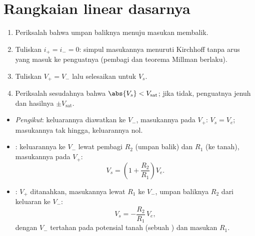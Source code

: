 \section{Rangkaian linear dasarnya}

\begin{method}\label{met:b1:operational-amplifier:method}
\begin{enumerate}
  \item Periksalah bahwa umpan baliknya menuju masukan membalik.
  \item Tuliskan $i_+ = i_- = 0$: simpul masukannya menuruti  Kirchhoff tanpa arus yang masuk ke penguatnya (pembagi
        dan teorema Millman berlaku).
  \item Tuliskan $V_+ = V_-$ lalu selesaikan untuk $V_s$.
  \item Periksalah sesudahnya bahwa $\abs{V_s} < V_{\mathrm{sat}}$; jika
        tidak, penguatnya jenuh dan hasilnya $\pm V_{\mathrm{sat}}$.
\end{enumerate}
\end{method}

\begin{proposition}\label{prop:b1:operational-amplifier:basic}
\begin{itemize}
  \item \emph{Pengikut}: keluarannya diawatkan ke $V_-$, masukannya pada
        $V_+$: $V_s = V_e$;  masukannya tak hingga, 
        keluarannya nol.
  \item \emph{}: keluarannya ke $V_-$ lewat pembagi
        $R_2$ (umpan balik) dan $R_1$ (ke tanah), masukannya pada $V_+$:
        \[
        V_s = \left(1 + \frac{R_2}{R_1}\right)V_e .
        \]
  \item \emph{}: $V_+$ ditanahkan, masukannya lewat
        $R_1$ ke $V_-$, umpan baliknya $R_2$ dari keluaran ke $V_-$:
        \[
        V_s = -\frac{R_2}{R_1}\,V_e ,
        \]
        dengan $V_-$ tertahan pada potensial tanah (sebuah \emph{}) dan  masukan $R_1$.
\end{itemize}
\end{proposition}

